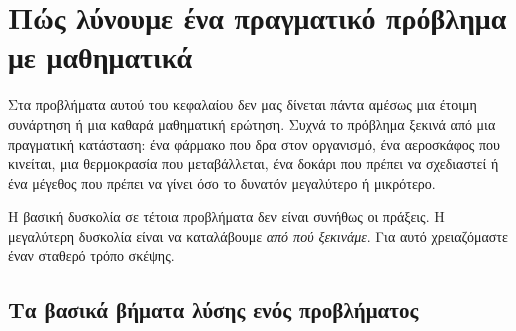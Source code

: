 \section{Πώς λύνουμε ένα πραγματικό πρόβλημα με μαθηματικά}

Στα προβλήματα αυτού του κεφαλαίου δεν μας δίνεται πάντα αμέσως μια έτοιμη συνάρτηση ή μια καθαρά μαθηματική ερώτηση. Συχνά το πρόβλημα ξεκινά από μια πραγματική κατάσταση: ένα φάρμακο που δρα στον οργανισμό, ένα αεροσκάφος που κινείται, μια θερμοκρασία που μεταβάλλεται, ένα δοκάρι που πρέπει να σχεδιαστεί ή ένα μέγεθος που πρέπει να γίνει όσο το δυνατόν μεγαλύτερο ή μικρότερο.

Η βασική δυσκολία σε τέτοια προβλήματα δεν είναι συνήθως οι πράξεις. Η μεγαλύτερη δυσκολία είναι να καταλάβουμε \emph{από πού ξεκινάμε}. Για αυτό χρειαζόμαστε έναν σταθερό τρόπο σκέψης.

\subsection{Τα βασικά βήματα λύσης ενός προβλήματος}

